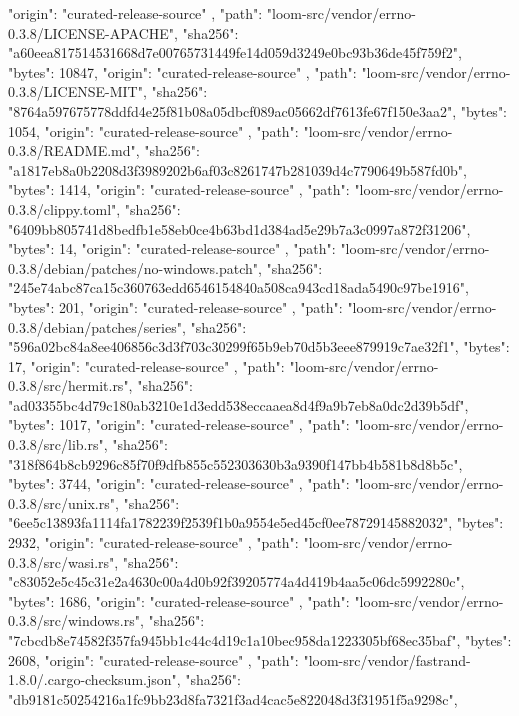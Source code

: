 {{      "origin": "curated-release-source"
    },
    {
      "path": "loom-src/vendor/errno-0.3.8/LICENSE-APACHE",
      "sha256": "a60eea817514531668d7e00765731449fe14d059d3249e0bc93b36de45f759f2",
      "bytes": 10847,
      "origin": "curated-release-source"
    },
    {
      "path": "loom-src/vendor/errno-0.3.8/LICENSE-MIT",
      "sha256": "8764a597675778ddfd4e25f81b08a05dbcf089ac05662df7613fe67f150e3aa2",
      "bytes": 1054,
      "origin": "curated-release-source"
    },
    {
      "path": "loom-src/vendor/errno-0.3.8/README.md",
      "sha256": "a1817eb8a0b2208d3f3989202b6af03c8261747b281039d4c7790649b587fd0b",
      "bytes": 1414,
      "origin": "curated-release-source"
    },
    {
      "path": "loom-src/vendor/errno-0.3.8/clippy.toml",
      "sha256": "6409bb805741d8bedfb1e58eb0ce4b63bd1d384ad5e29b7a3c0997a872f31206",
      "bytes": 14,
      "origin": "curated-release-source"
    },
    {
      "path": "loom-src/vendor/errno-0.3.8/debian/patches/no-windows.patch",
      "sha256": "245e74abc87ca15c360763edd6546154840a508ca943cd18ada5490c97be1916",
      "bytes": 201,
      "origin": "curated-release-source"
    },
    {
      "path": "loom-src/vendor/errno-0.3.8/debian/patches/series",
      "sha256": "596a02bc84a8ee406856c3d3f703c30299f65b9eb70d5b3eee879919c7ae32f1",
      "bytes": 17,
      "origin": "curated-release-source"
    },
    {
      "path": "loom-src/vendor/errno-0.3.8/src/hermit.rs",
      "sha256": "ad03355bc4d79c180ab3210e1d3edd538eccaaea8d4f9a9b7eb8a0dc2d39b5df",
      "bytes": 1017,
      "origin": "curated-release-source"
    },
    {
      "path": "loom-src/vendor/errno-0.3.8/src/lib.rs",
      "sha256": "318f864b8cb9296c85f70f9dfb855c552303630b3a9390f147bb4b581b8d8b5c",
      "bytes": 3744,
      "origin": "curated-release-source"
    },
    {
      "path": "loom-src/vendor/errno-0.3.8/src/unix.rs",
      "sha256": "6ee5c13893fa1114fa1782239f2539f1b0a9554e5ed45cf0ee78729145882032",
      "bytes": 2932,
      "origin": "curated-release-source"
    },
    {
      "path": "loom-src/vendor/errno-0.3.8/src/wasi.rs",
      "sha256": "c83052e5c45c31e2a4630c00a4d0b92f39205774a4d419b4aa5c06dc5992280c",
      "bytes": 1686,
      "origin": "curated-release-source"
    },
    {
      "path": "loom-src/vendor/errno-0.3.8/src/windows.rs",
      "sha256": "7cbcdb8e74582f357fa945bb1c44c4d19c1a10bec958da1223305bf68ec35baf",
      "bytes": 2608,
      "origin": "curated-release-source"
    },
    {
      "path": "loom-src/vendor/fastrand-1.8.0/.cargo-checksum.json",
      "sha256": "db9181c50254216a1fc9bb23d8fa7321f3ad4cac5e822048d3f31951f5a9298c",
}}
